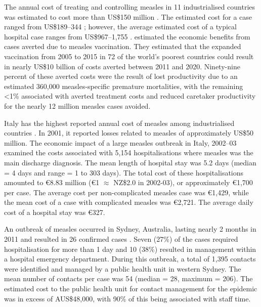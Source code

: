 \documentclass{article}
\begin{document}
\begin{itemize}
The annual cost of treating and controlling measles in 11 industrialised countries was estimated to cost more than US\$150 million \citep{carabin3}. The estimated cost for a case ranged from US\$189--344 \citep{carabin3}; however, the average estimated cost of a typical hospital case ranges from US\$967--1,755 \citep{carabin2}. \citep{stack11} estimated the economic benefits from cases averted due to measles vaccination. They estimated that the expanded vaccination from 2005 to 2015 in 72 of the world's poorest countries could result in nearly US\$10 billion of costs averted between 2011 and 2020. Ninety-nine percent of these averted costs were the result of lost productivity due to an estimated 360,000 measles-specific premature mortalities, with the remaining <1\% associated with averted treatment costs and reduced caretaker productivity for the nearly 12 million measles cases avoided.

Italy has the highest reported annual cost of measles among industrialised countries \citep{carabin3}. In 2001, it reported losses related to measles of approximately US\$50 million. The economic impact of a large measles outbreak in Italy, 2002--03 examined the costs associated with 5,154 hospitalisations where measles was the main discharge diagnosis. The mean length of hospital stay was 5.2 days (median = 4 days and range = 1 to 303 days). The total cost of these hospitalisations amounted to \euro 8.83 million (\euro 1 $\approx$ NZ\$2.0 in 2002-03), or approximately \euro 1,700 per case. The average cost per non-complicated measles case was  \euro 1,429, while the mean cost of a case with complicated measles was  \euro 2,721. The average daily cost of a hospital stay was  \euro 327.

An outbreak of measles occurred in Sydney, Australia, lasting nearly 2 months in 2011 and resulted in 26 confirmed cases \citep{flego13}. Seven (27\%) of the cases required hospitalisation for more than 1 day and 10 (38\%) resulted in management within a hospital emergency department. During this outbreak, a total of 1,395 contacts were identified and managed by a public health unit in western Sydney. The mean number of contacts per case was 54 (median = 28, maximum = 206). The estimated cost to the public health unit for contact management for the epidemic was in excess of AUS\$48,000, with 90\% of this being associated with staff time. 


\end{itemize}
\end{document}
